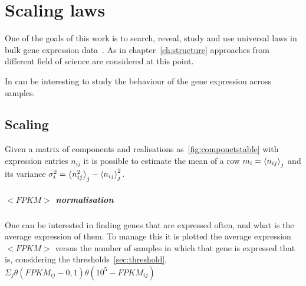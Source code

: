 \chapter{Scaling laws}\label{ch:scalinglaws}
One of the goals of this work is to search, reveal, study and use universal laws in bulk gene expression data~\nocite{altmann2016statistical}.
As in chapter~\ref{ch:structure} approaches from different field of science are considered at this point.

In can be interesting to study the behaviour of the gene expression across samples.

\section{Scaling}

Given a matrix of components and realisations as~\ref{fig:componetstable} with expression entries $n_{i j}$ it is possible to estimate the mean of a row $m_i=\left\langle n_{i
 j}\right\rangle_j$ and its variance $\sigma^2_{i}=\left\langle n_{i j}^2\right\rangle_j - \left\langle n_{i j}\right\rangle^2_j$.



\paragraph{$<FPKM>$ normalisation}
One can be interested in finding genes that are expressed often, and what is the
average expression of them.
To manage this it is plotted the average expression $<FPKM>$ versus the number
of samples in which that gene is expressed that is, considering the thresholds~\ref{sec:threshold},
$\Sigma_j\theta (FPKM_{ij}-0,1)\theta (10^5-FPKM_{ij})$

